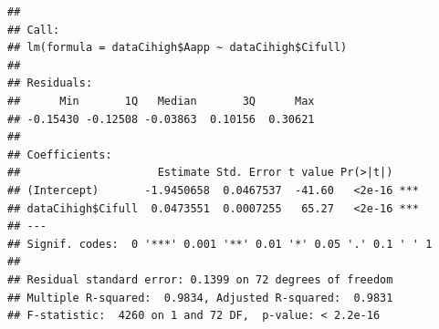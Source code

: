 \documentclass[
]{krantz}
\makeatletter
\newenvironment{Shaded}{\begin{snugshade}}{\end{snugshade}}
\newcommand{\DecValTok}[1]{\textcolor[rgb]{0.00,0.00,0.81}{#1}}
\newcommand{\KeywordTok}[1]{\textcolor[rgb]{0.13,0.29,0.53}{\textbf{#1}}}
\newcommand{\NormalTok}[1]{#1}
\newcommand{\OperatorTok}[1]{\textcolor[rgb]{0.81,0.36,0.00}{\textbf{#1}}}
\newcommand{\StringTok}[1]{\textcolor[rgb]{0.31,0.60,0.02}{#1}}
\newenvironment{kframe}{%
\medskip{}
\setlength{\fboxsep}{.8em}
 \def\at@end@of@kframe{}%
 \ifinner\ifhmode%
  \def\at@end@of@kframe{\end{minipage}}%
  \begin{minipage}{\columnwidth}%
 \fi\fi%
 \def\FrameCommand##1{\hskip\@totalleftmargin \hskip-\fboxsep
 \colorbox{shadecolor}{##1}\hskip-\fboxsep
     \hskip-\linewidth \hskip-\@totalleftmargin \hskip\columnwidth}%
 \MakeFramed {\advance\hsize-\width
   \@totalleftmargin\z@ \linewidth\hsize
   \@setminipage}}%
 {\par\unskip\endMakeFramed%
 \at@end@of@kframe}
\renewenvironment{Shaded}{\begin{kframe}}{\end{kframe}}
\makeatother
\begin{document}
\begin{Shaded}
\end{Shaded}

\begin{verbatim}
## 
## Call:
## lm(formula = dataCihigh$Aapp ~ dataCihigh$Cifull)
## 
## Residuals:
##      Min       1Q   Median       3Q      Max 
## -0.15430 -0.12508 -0.03863  0.10156  0.30621 
## 
## Coefficients:
##                     Estimate Std. Error t value Pr(>|t|)    
## (Intercept)       -1.9450658  0.0467537  -41.60   <2e-16 ***
## dataCihigh$Cifull  0.0473551  0.0007255   65.27   <2e-16 ***
## ---
## Signif. codes:  0 '***' 0.001 '**' 0.01 '*' 0.05 '.' 0.1 ' ' 1
## 
## Residual standard error: 0.1399 on 72 degrees of freedom
## Multiple R-squared:  0.9834,	Adjusted R-squared:  0.9831 
## F-statistic:  4260 on 1 and 72 DF,  p-value: < 2.2e-16
\end{verbatim}
\end{document}
